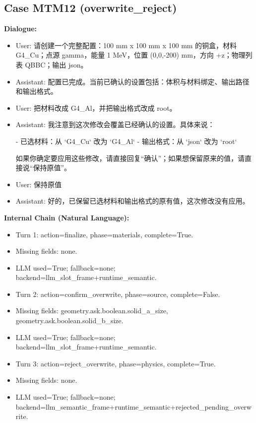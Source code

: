 \documentclass[11pt]{ctexart}
\begin{document}
\subsection{Case MTM12 (overwrite\_reject)}
\textbf{Dialogue:}
\begin{itemize}
\item User: 请创建一个完整配置：100 mm x 100 mm x 100 mm 的铜盒，材料 G4\_Cu；点源 gamma，能量 1 MeV，位置 (0,0,-200) mm，方向 +z；物理列表 QBBC；输出 json。
\item Assistant: 配置已完成。当前已确认的设置包括：体积与材料绑定、输出路径和输出格式。
\item User: 把材料改成 G4\_Al，并把输出格式改成 root。
\item Assistant: 我注意到这次修改会覆盖已经确认的设置。具体来说：

- 已选材料：从 `G4\_Cu` 改为 `G4\_Al`
- 输出格式：从 `json` 改为 `root`

如果你确定要应用这些修改，请直接回复“确认”；如果想保留原来的值，请直接说“保持原值”。
\item User: 保持原值
\item Assistant: 好的，已保留已选材料和输出格式的原有值，这次修改没有应用。
\end{itemize}
\textbf{Internal Chain (Natural Language):}
\begin{itemize}
\item Turn 1: action=finalize, phase=materials, complete=True.
\item Missing fields: none.
\item LLM used=True; fallback=none; backend=llm\_slot\_frame+runtime\_semantic.
\item Turn 2: action=confirm\_overwrite, phase=source, complete=False.
\item Missing fields: geometry.ask.boolean.solid\_a\_size, geometry.ask.boolean.solid\_b\_size.
\item LLM used=True; fallback=none; backend=llm\_slot\_frame+runtime\_semantic.
\item Turn 3: action=reject\_overwrite, phase=physics, complete=True.
\item Missing fields: none.
\item LLM used=True; fallback=none; backend=llm\_semantic\_frame+runtime\_semantic+rejected\_pending\_overwrite.
\end{itemize}
\end{document}

